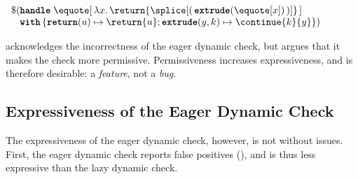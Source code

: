 \begin{code} 
 \begin{source}
  $\begin{array}{l}
      \$ (\textbf{\texttt{handle}} \; \equote[\, {\lambda x. \,\return{\splice[( \, {{\textbf{\texttt{extrude}}(\equote[x])}} \,)]}} \,] \\
      \;\;\,\, \textbf{\texttt{with}} \, \{ \textbf{\texttt{return}}(u) \mapsto {\return{u}}; \textbf{\texttt{extrude}}(y, k) \mapsto {{\continue{k}{y}}}\})
    \end{array}$
 \end{source}
 \label{listing:eager-scope-extrusion-unsafe-continue}
\end{code}


\citet{kiselyov-14} acknowledges the incorrectness of the eager dynamic check, but argues that it makes the check more permissive. Permissiveness increases expressiveness, and is therefore desirable: a \textit{feature}, not a \textit{bug}. 

\subsection{Expressiveness of the Eager Dynamic Check}\label{subsection:eager-dynamic-expressiveness}
The expressiveness of the eager dynamic check, however, is not without issues. First, the eager dynamic check reports false positives (), and is thus less expressive than the lazy dynamic check.

